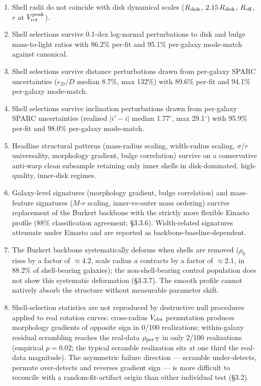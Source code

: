 \documentclass[linenumbers,trackchanges]{aastex701}
\begin{document}
\begin{enumerate}
  \item Shell radii do not coincide with disk dynamical scales ($R_{\rm disk}$, $2.15\,R_{\rm disk}$, $R_{\rm eff}$, $r$ at $V_{\rm rot}^{\rm peak}$).
  \item Shell selections survive 0.1-dex log-normal perturbations to disk and bulge mass-to-light ratios with 86.2\% per-fit and 95.1\% per-galaxy mode-match against canonical.
  \item Shell selections survive distance perturbations drawn from per-galaxy SPARC uncertainties ($e_D / D$ median 8.7\%, max 132\%) with 89.6\% per-fit and 94.1\% per-galaxy mode-match.
  \item Shell selections survive inclination perturbations drawn from per-galaxy SPARC uncertainties (realized $|i' - i|$ median 1.77$^{\circ}$, max 29.1$^{\circ}$) with 95.9\% per-fit and 98.0\% per-galaxy mode-match.
  \item Headline structural patterns (mass-radius scaling, width-radius scaling, $\sigma/r$ universality, morphology gradient, bulge correlation) survive on a conservative anti-warp clean subsample retaining only inner shells in disk-dominated, high-quality, inner-disk regimes.
  \item Galaxy-level signatures (morphology gradient, bulge correlation) and mass-feature signatures ($M$-$r$ scaling, inner-vs-outer mass ordering) survive replacement of the Burkert backbone with the strictly more flexible Einasto profile (88\% classification agreement; \S3.3.6). Width-related signatures attenuate under Einasto and are reported as backbone-baseline-dependent.
  \item The Burkert backbone systematically deforms when shells are removed ($\rho_0$ rises by a factor of $\approx 4.2$, scale radius $a$ contracts by a factor of $\approx 2.1$, in 88.2\% of shell-bearing galaxies); the non-shell-bearing control population does not show this systematic deformation (\S3.3.7). The smooth profile cannot natively absorb the structure without measurable parameter shift.
  \item Shell-selection statistics are not reproduced by destructive null procedures applied to real rotation curves: cross-radius $V_{\rm obs}$ permutation produces morphology gradients of opposite sign in 0/100 realizations; within-galaxy residual scrambling reaches the real-data $\rho_{\rm per\,T}$ in only 2/100 realizations (empirical $p = 0.02$; the typical scramble realization sits at one third the real-data magnitude). The asymmetric failure direction --- scramble under-detects, permute over-detects and reverses gradient sign --- is more difficult to reconcile with a random-fit-artifact origin than either individual test (\S3.2).

\end{enumerate}
\end{document}
